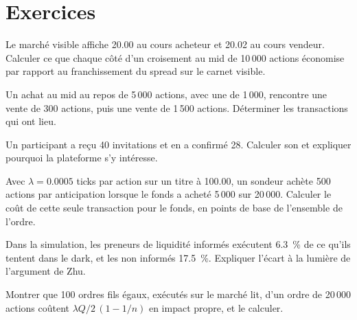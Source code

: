 \section{Exercices}

\begin{exercise}[$\star$]\label{exo:mx:dark-pools-and-blocks:1}
Le marché visible affiche 20.00 au cours acheteur et 20.02 au cours vendeur. Calculer ce que chaque côté d'un croisement au mid de 10\,000 actions économise par rapport au franchissement du spread sur le carnet visible.
\end{exercise}

\begin{exercise}[$\star$]\label{exo:mx:dark-pools-and-blocks:2}
Un achat au mid au repos de 5\,000 actions, avec une  de 1\,000, rencontre une vente de 300 actions, puis une vente de 1\,500 actions. Déterminer les transactions qui ont lieu.
\end{exercise}

\begin{exercise}[$\star$]\label{exo:mx:dark-pools-and-blocks:3}
Un participant a reçu 40 invitations et en a confirmé 28. Calculer son  et expliquer pourquoi la plateforme s'y intéresse.
\end{exercise}

\begin{exercise}[$\star\star$]\label{exo:mx:dark-pools-and-blocks:4}
Avec $\lambda=0.0005$ ticks par action sur un titre à 100.00, un sondeur achète 500 actions par anticipation lorsque le fonds a acheté 5\,000 sur 20\,000. Calculer le coût de cette seule
transaction pour le fonds, en points de base de l'ensemble de l'ordre.
\end{exercise}

\begin{exercise}[$\star\star$]\label{exo:mx:dark-pools-and-blocks:5}
Dans la simulation, les preneurs de liquidité informés exécutent 6.3~\% de ce qu'ils tentent dans le dark, et les non informés 17.5~\%. Expliquer l'écart à la lumière de l'argument de Zhu.
\end{exercise}

\begin{exercise}[$\star\star$]\label{exo:mx:dark-pools-and-blocks:6}
Montrer que 100 ordres fils égaux, exécutés sur le marché lit, d'un ordre de 20\,000 actions coûtent $\lambda Q/2\,(1-1/n)$ en impact propre, et le calculer.
\end{exercise}

